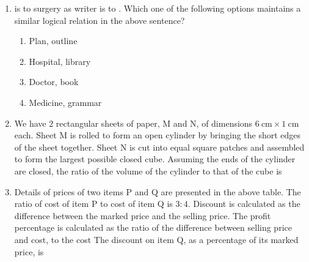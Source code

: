 \documentclass[journal,12pt,onecolumn]{IEEEtran}
\theoremstyle{remark}
\begin{document}
\begin{enumerate}
		\item \underline{\hspace{2cm}} is to surgery as writer is to \underline{\hspace{2cm}}. Which one of the following options maintains a similar logical relation in the above sentence?
		
		\hfill{}
		
		\begin{enumerate}
			\item Plan, outline
			\item Hospital, library
			\item Doctor, book
			\item Medicine, grammar
		\end{enumerate}
		
		\item We have $2$ rectangular sheets of paper, M and N, of dimensions $6~\text{cm} \times 1~\text{cm}$ each. Sheet M is rolled to form an open cylinder by bringing the short edges of the sheet together. Sheet N is cut into equal square patches and assembled to form the largest possible closed cube. Assuming the ends of the cylinder are closed, the ratio of the volume of the cylinder to that of the cube is
		
		\hfill{}
		
		\begin{enumerate}
		\end{enumerate}
		
		\item Details of prices of two items P and Q are presented in the above table. The ratio of cost of item P to cost of item Q is $3:4$. Discount is calculated as the difference between the marked price and the selling price. The profit percentage is calculated as the ratio of the difference between selling price and cost, to the cost %
		The discount on item Q, as a percentage of its marked price, is
		
		\hfill{}
		

\end{enumerate}
\end{document}
